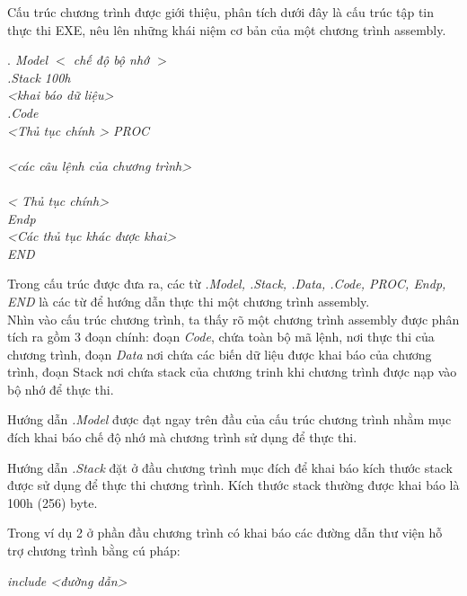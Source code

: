 Cấu trúc chương trình được giới thiệu, phân tích dưới đây là cấu trúc tập tin thực thi EXE, nêu lên những khái niệm cơ bản của một chương trình assembly. \\
	\begin{boxedminipage}{15cm}
		\begin{normalsize}
			\setlength{\parindent}{1cm}		
			\renewcommand{\rmdefault}{cmss}
			\textit {$.$ Model	$<$ chế độ bộ nhớ $>$	}		\\	
			\textit{.Stack 100h } \\			
			\indent \textit{<khai báo dữ liệu>} \\			
			 \textit{.Code}\\
			\indent \textit{<Thủ tục chính > PROC}\\ \\
			\indent \textit{<các câu lệnh của chương trình>}\\ \\
			\indent \textit{< Thủ tục chính> } \\
			\indent \textit{Endp}\\
			\indent \textit{<Các thủ tục khác được khai>}\\
			\indent \textit{END}\\
	\end{normalsize}
\end{boxedminipage}
	
	Trong cấu trúc được đưa ra, các từ \textit {.Model, .Stack, .Data, .Code, PROC, Endp, END} là các từ để hướng dẫn thực thi một chương trình assembly. \\

Nhìn vào cấu trúc chương trình, ta thấy rõ một chương trình assembly được phân tích ra gồm 3 đoạn chính: đoạn \textit{Code}, chứa toàn bộ mã lệnh, nơi thực thi của chương trình, đoạn \textit{Data} nơi chứa các biến dữ liệu được khai báo của chương trình, đoạn Stack nơi chứa stack của chương trinh khi chương trình được nạp vào bộ nhớ để thực thi.

Hướng dẫn \textit{.Model} được đạt ngay trên đầu của cấu trúc chương trình nhằm mục đích khai báo chế độ nhớ mà chương trình sử dụng để thực thi.

Hướng dẫn \textit{.Stack} đặt ở đầu chương trình mục đích để khai báo kích thước stack được sử dụng để thực thi chương trình. Kích thước stack thường được khai báo là 100h (256) byte.

	Trong ví dụ 2 ở phần đầu chương trình có khai báo các đường dẫn thư viện hỗ trợ chương trình bằng cú pháp:
		\begin{center}
			\textit { include <đường dẫn>} 
		\end{center}
		
